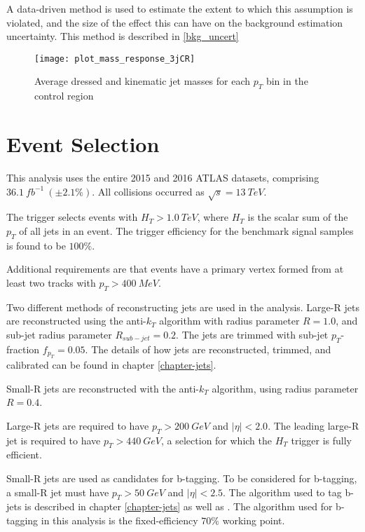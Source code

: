 A data-driven method is used to estimate the extent to which this
assumption is violated, and the size of the effect this can have on
the background estimation uncertainty. This method is described in
\ref{bkg_uncert}

\begin{figure}[h]
\texttt{[image: plot\_mass\_response\_3jCR]}
\centering
\caption{Average dressed and kinematic jet masses for each $p_T$ bin
  in the control region}
\label{fig:response_3jCR}

\end{figure}

\section{Event Selection}
This analysis uses the entire 2015 and 2016 ATLAS datasets, comprising
$36.1~fb^{-1}~(\pm2.1\%)$. All collisions occurred as
$\sqrt{s}=13~TeV$. 

The trigger selects events with $H_{T}>1.0~TeV$, where $H_{T}$ is the
scalar sum of the $p_{T}$ of all jets in an event. The trigger
efficiency for the benchmark signal samples is found to be $100\%$.

Additional requirements are that events have a primary vertex formed
from at least two tracks with $p_{T}>400~MeV$.

Two different methods of reconstructing jets are used in the
analysis. Large-R jets are reconstructed using the anti-$k_{T}$
algorithm with radius parameter
$R=1.0$, and sub-jet radius parameter $R_{sub-jet}=0.2$. The jets are
trimmed with sub-jet $p_{T}$-fraction $f_{p_{T}}=0.05$. The details of
how jets are reconstructed, trimmed, and calibrated can be found in
chapter \ref{chapter-jets}.

Small-R jets are reconstructed with the anti-$k_{T}$ algorithm, using
radius parameter $R=0.4$. 

Large-R jets are required to have $p_{T}>200~GeV$ and
$|\eta|<2.0$. The leading large-R jet is required to have
$p_{T}>440~GeV$, a selection for which the $H_{T}$ trigger is fully
efficient.

Small-R jets are used as candidates for b-tagging. To be considered for b-tagging, a small-R jet
must have $p_{T}>50~GeV$ and $|\eta|<2.5$. The algorithm used to tag
b-jets is described in chapter \ref{chapter-jets} as well as
\cite{b-jet-perf-1, b-jet-perf-2}. The algorithm used for b-tagging in
this analysis is the fixed-efficiency $70\%$ working point.

